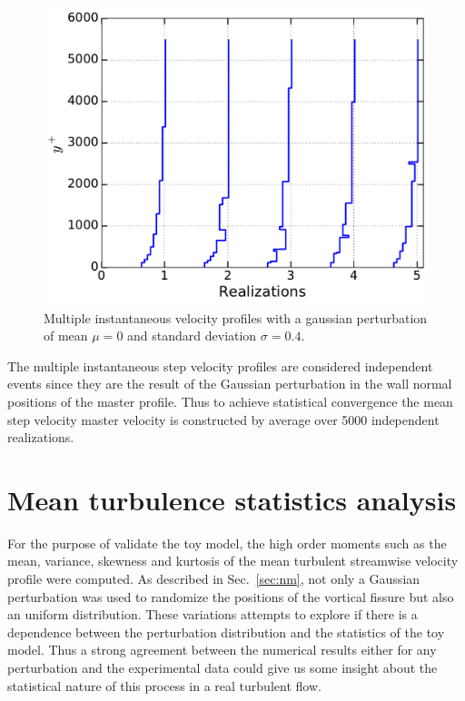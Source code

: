 \documentclass[aps,reprint,amsmath,amssymb,pra]{revtex4-1}%
\begin{document}
\begin{figure}[tbh]
\includegraphics[scale=0.45]{figures/multiple_instantaneous_vprof}
\caption{\label{fig:mul_profiles} Multiple instantaneous velocity profiles with a gaussian perturbation of mean $\mu=0$ and standard deviation $\sigma=0.4$.}
\end{figure}

The multiple instantaneous step velocity profiles are considered independent events since they are the result of the Gaussian perturbation in the wall normal positions of the master profile. Thus to achieve statistical convergence the mean step velocity master velocity is constructed by average over 5000 independent realizations.
\section{Mean turbulence statistics analysis}
For the purpose of validate the toy model, the high order moments such as the mean, variance, skewness and kurtosis of the mean turbulent streamwise velocity profile were computed. As described in Sec.~\ref{sec:nm}, not only a Gaussian perturbation was used to randomize the positions of the vortical fissure but also an uniform distribution. These variations attempts to explore if there is a dependence between the perturbation distribution and the statistics of the toy model. Thus a strong agreement between the numerical results either for any perturbation and the experimental data could give us some insight about the statistical nature of this process in a real turbulent flow.
\end{document}
